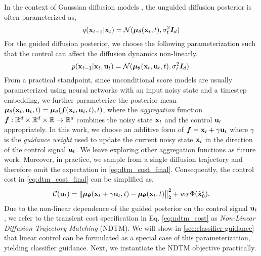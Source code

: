 In the context of Gaussian diffusion models \citep{ho2020denoising, songscore, karraselucidating}, the unguided diffusion posterior is often parameterized as,
\begin{equation}
    q({\mathbf{x}}_{t-1}|{\mathbf{x}}_t) = {\mathcal{N}}({\bm{\mu}}_\theta({\mathbf{x}}_t, t), \sigma_t^2{\bm{I}}_d)
    \label{eq:unguided_param}
\end{equation}
For the guided diffusion posterior, we choose the following parameterization such that the control can affect the diffusion dynamics non-linearly.
\begin{equation}
    p({\mathbf{x}}_{t-1}|{\mathbf{x}}_t, {\mathbf{u}}_t) = {\mathcal{N}}({\bm{\mu}}_\theta({\mathbf{x}}_t, {\mathbf{u}}_t, t), \sigma_t^2{\bm{I}}_d).
\end{equation}
From a practical standpoint, since unconditional score models are usually parameterized using neural networks with an input noisy state and a timestep embedding, we further parameterize the posterior mean ${\bm{\mu}}_\theta({\mathbf{x}}_t, {\mathbf{u}}_t, t) = {\bm{\mu}}_\theta({\bm{f}}({\mathbf{x}}_t, {\mathbf{u}}_t, t), t)$,
where the \emph{aggregation} function ${\bm{f}}: {\mathbb{R}}^d \times {\mathbb{R}}^d \times {\mathbb{R}} \rightarrow {\mathbb{R}}^d$ combines the noisy state ${\mathbf{x}}_t$ and the control ${\mathbf{u}}_t$ appropriately. In this work, we choose an additive form of ${\bm{f}} = {\mathbf{x}}_t + \gamma {\mathbf{u}}_t$ where $\gamma$ is the \emph{guidance weight} used to update the current noisy state ${\mathbf{x}}_t$ in the direction of the control signal ${\mathbf{u}}_t$. We leave exploring other aggregation functions as future work. Moreover, in practice, we sample from a single diffusion trajectory and therefore omit the expectation in \cref{eq:dtm_cost_final}. Consequently, the control cost in \cref{eq:dtm_cost_final} can be simplified as,
\begin{align}
    \gC(\rvu_t) = %
    \Vert \vmu_\vtheta(\rvx_t + \gamma\rvu_t, t) - \vmu_\vtheta(\rvx_t, t) \big\Vert_2^2 + w_T \Phi(\hat{\rvx}_0^t).
    \label{eq:ndtm_cost}
\end{align}
Due to the non-linear dependence of the guided posterior on the control signal ${\mathbf{u}}_t$, we refer to the transient cost specification in Eq. \ref{eq:ndtm_cost} as \emph{Non-Linear Diffusion Trajectory Matching} (NDTM). We will show in \cref{sec:classifier-guidance} that linear control can be formulated as a special case of this parameterization, yielding classifier guidance. Next, we instantiate the NDTM objective practically.


